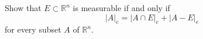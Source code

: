 \begin{solution}
\end{solution}

\begin{problem}{6}
Show that $E \subset \mathbb{R}^{n}$ is measurable if and only if 
\[
\left| A \right|_{e } = \left| A \cap E  \right|_{e} + \left| A - E  \right|_{e}
\] 
for every subset $A$ of $\mathbb{R}^{n}$.
\end{problem}

\begin{solution}
\end{solution}
